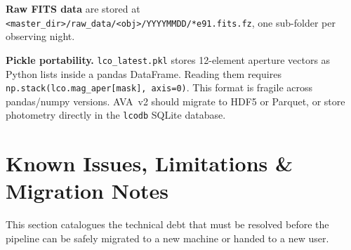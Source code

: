 \documentclass[12pt,a4paper]{article}
\begin{document}
\textbf{Raw FITS data} are stored at
\texttt{<master\_dir>/raw\_data/<obj>/YYYYMMDD/*e91.fits.fz}, one sub-folder per
observing night.

\begin{warnbox}
\textbf{Pickle portability.}  \texttt{lco\_latest.pkl} stores 12-element aperture
vectors as Python lists inside a pandas DataFrame.  Reading them requires
\texttt{np.stack(lco.mag\_aper[mask], axis=0)}.  This format is fragile across
pandas/numpy versions.  AVA~v2 should migrate to HDF5 or Parquet, or store photometry
directly in the \texttt{lcodb} SQLite database.
\end{warnbox}

\section{Known Issues, Limitations \& Migration Notes}
\label{sec:issues}

This section catalogues the technical debt that must be resolved before the pipeline can
be safely migrated to a new machine or handed to a new user.
\end{document}
